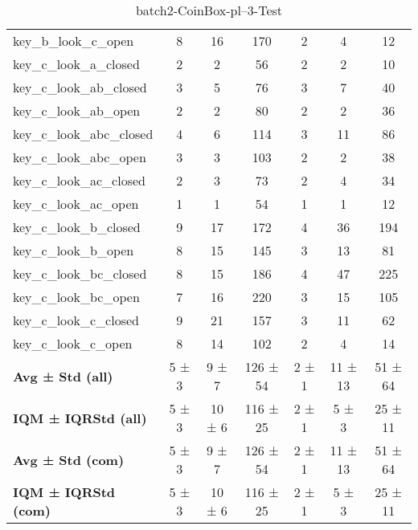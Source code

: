 \begin{table}[!ht]
\begin{tabular}{l|ccc|ccc}
key\_b\_look\_c\_open & 8 & 16 & 170 & 2 & 4 & 12 \\
key\_c\_look\_a\_closed & 2 & 2 & 56 & 2 & 2 & 10 \\
key\_c\_look\_ab\_closed & 3 & 5 & 76 & 3 & 7 & 40 \\
key\_c\_look\_ab\_open & 2 & 2 & 80 & 2 & 2 & 36 \\
key\_c\_look\_abc\_closed & 4 & 6 & 114 & 3 & 11 & 86 \\
key\_c\_look\_abc\_open & 3 & 3 & 103 & 2 & 2 & 38 \\
key\_c\_look\_ac\_closed & 2 & 3 & 73 & 2 & 4 & 34 \\
key\_c\_look\_ac\_open & 1 & 1 & 54 & 1 & 1 & 12 \\
key\_c\_look\_b\_closed & 9 & 17 & 172 & 4 & 36 & 194 \\
key\_c\_look\_b\_open & 8 & 15 & 145 & 3 & 13 & 81 \\
key\_c\_look\_bc\_closed & 8 & 15 & 186 & 4 & 47 & 225 \\
key\_c\_look\_bc\_open & 7 & 16 & 220 & 3 & 15 & 105 \\
key\_c\_look\_c\_closed & 9 & 21 & 157 & 3 & 11 & 62 \\
key\_c\_look\_c\_open & 8 & 14 & 102 & 2 & 4 & 14 \\
\hline
\textbf{Avg ± Std (all)} & 5 ± 3 & 9 ± 7 & 126 ± 54 & 2 ± 1 & 11 ± 13 & 51 ± 64 \\
\textbf{IQM ± IQRStd (all)} & 5 ± 3 & 10 ± 6 & 116 ± 25 & 2 ± 1 & 5 ± 3 & 25 ± 11 \\
\textbf{Avg ± Std (com)} & 5 ± 3 & 9 ± 7 & 126 ± 54 & 2 ± 1 & 11 ± 13 & 51 ± 64 \\
\textbf{IQM ± IQRStd (com)} & 5 ± 3 & 10 ± 6 & 116 ± 25 & 2 ± 1 & 5 ± 3 & 25 ± 11 \\
\end{tabular}
\caption{batch2-CoinBox-pl--3-Test}
\label{tab:batch2_CoinBox_pl__3_comparison_test}
\end{table}

